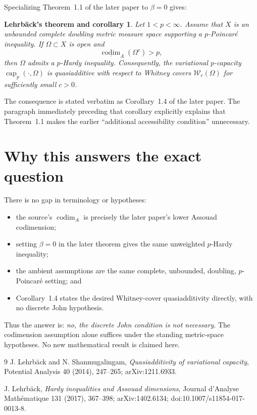 \documentclass[11pt]{article}
\newtheorem*{laterthm}{Lehrb\"ack's theorem and corollary}
\begin{document}
Specializing Theorem~1.1 of the later paper to $\beta=0$ gives:

\begin{laterthm}
Let $1<p<\infty$.  Assume that $X$ is an unbounded complete doubling
metric measure space supporting a $p$-Poincar\'e inequality.  If
$\Omega\subset X$ is open and
\[
 \underline{\operatorname{codim}}_{A}(\Omega^c)>p,
\]
then $\Omega$ admits a $p$-Hardy inequality.  Consequently, the
variational $p$-capacity $\operatorname{cap}_p(\cdot,\Omega)$ is
quasiadditive with respect to Whitney covers $\mathcal W_c(\Omega)$ for
sufficiently small $c>0$.
\end{laterthm}

The consequence is stated verbatim as Corollary~1.4 of the later paper.
The paragraph immediately preceding that corollary explicitly explains
that Theorem~1.1 makes the earlier ``additional accessibility condition''
unnecessary.

\section{Why this answers the exact question}

There is no gap in terminology or hypotheses:

\begin{itemize}
  \item the source's $\operatorname{codim}_{A}$ is precisely the later
  paper's lower Assouad codimension;
  \item setting $\beta=0$ in the later theorem gives the same unweighted
  $p$-Hardy inequality;
  \item the ambient assumptions are the same complete, unbounded,
  doubling, $p$-Poincar\'e setting; and
  \item Corollary~1.4 states the desired Whitney-cover quasiadditivity
  directly, with no discrete John hypothesis.
\end{itemize}

Thus the answer is: \emph{no, the discrete John condition is not
necessary}.  The codimension assumption alone suffices under the standing
metric-space hypotheses.  No new mathematical result is claimed here.

\begin{thebibliography}{9}
J. Lehrb\"ack and N. Shanmugalingam,
\emph{Quasiadditivity of variational capacity},
Potential Analysis 40 (2014), 247--265; arXiv:1211.6933.

J. Lehrb\"ack,
\emph{Hardy inequalities and Assouad dimensions},
Journal d'Analyse Math\'ematique 131 (2017), 367--398;
arXiv:1402.6134; doi:10.1007/s11854-017-0013-8.
\end{thebibliography}
\end{document}

